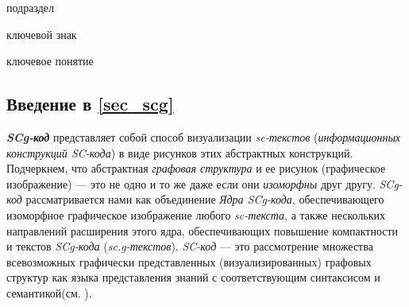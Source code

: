 \begin{SCn}
\begin{scnrelfromlist}{подраздел}
\end{scnrelfromlist}

\bigskip

\begin{scnrelfromlist}{ключевой знак}
\end{scnrelfromlist}

\begin{scnrelfromlist}{ключевое понятие}
\end{scnrelfromlist}
\end{SCn}

\subsection*{Введение в \ref{sec_scg}}

\begin{SCn}
\end{SCn}

\textbf{\textit{SCg-код}} представляет собой способ визуализации \textit{sc-текстов} (\textit{информационных конструкций SC-кода}) в виде рисунков этих абстрактных конструкций. Подчеркнем, что абстрактная \textit{графовая структура} и ее рисунок (графическое изображение) --- это не одно и то же даже если они \textit{изоморфны} друг другу. \mbox{\textit{SCg-код}} рассматривается нами как объединение \textit{Ядра SCg-кода}, обеспечивающего изоморфное графическое изображение любого \textit{sc-текста}, а также нескольких направлений расширения этого ядра, обеспечивающих повышение компактности и  текстов \textit{SCg-кода} (\textit{sc.g-текстов}).
\textit{SC-код} --- это рассмотрение множества всевозможных графически представленных (визуализированных) графовых структур как  языка представления знаний с соответствующим синтаксисом и семантикой(см. ).

